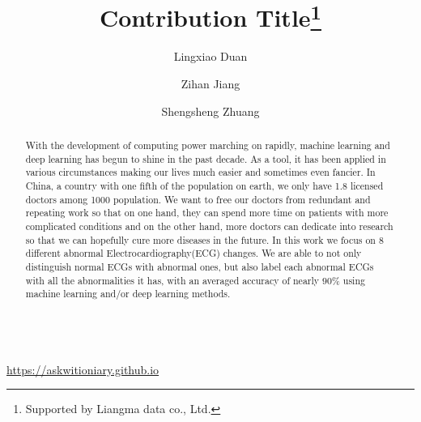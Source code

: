 \documentclass[runningheads]{llncs}
\begin{document}
%
\title{Contribution Title\thanks{Supported by Liangma data co., Ltd.}}
%
%
\author{Lingxiao Duan \and
Zihan Jiang \and
Shengsheng Zhuang}
%
%
\\
\url{https://askwitioniary.github.io}
%
\maketitle              %
%
\begin{abstract}
With the development of computing power marching on rapidly, machine learning and deep learning has begun to shine in the past decade. As a tool, it has been applied in various circumstances making our lives much easier and sometimes even fancier. In China, a country with one fifth of the population on earth, we only have 1.8 \cite{OECD} licensed doctors among 1000 population. We want to free our doctors from redundant and repeating work so that on one hand, they can spend more time on patients with more complicated conditions and on the other hand, more doctors can dedicate into research so that we can hopefully cure more diseases in the future. In this work we focus on 8 different abnormal Electrocardiography(ECG) changes. We are able to not only distinguish normal ECGs with abnormal ones, but also label each abnormal ECGs with all the abnormalities it has, with an averaged accuracy of nearly $90\%$ using machine learning and/or deep learning methods.

\end{abstract}
%
%
%
\end{document}
